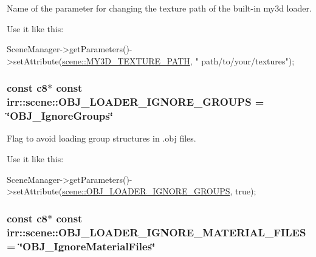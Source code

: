 Name of the parameter for changing the texture path of the built-\/in my3d loader. 

Use it like this\+: 
\begin{DoxyCode}
SceneManager->getParameters()->setAttribute(\hyperlink{namespaceirr_1_1scene_a54eb9ea68ba13b4689444f8d34e338b9}{scene::MY3D\_TEXTURE\_PATH}, \textcolor{stringliteral}{"
      path/to/your/textures"});
\end{DoxyCode}
\subsubsection[{\texorpdfstring{O\+B\+J\+\_\+\+L\+O\+A\+D\+E\+R\+\_\+\+I\+G\+N\+O\+R\+E\+\_\+\+G\+R\+O\+U\+PS}{OBJ\_LOADER\_IGNORE\_GROUPS}}]{\setlength{\rightskip}{0pt plus 5cm}const {\bf c8}$\ast$ const irr\+::scene\+::\+O\+B\+J\+\_\+\+L\+O\+A\+D\+E\+R\+\_\+\+I\+G\+N\+O\+R\+E\+\_\+\+G\+R\+O\+U\+PS = \char`\"{}O\+B\+J\+\_\+\+Ignore\+Groups\char`\"{}}\hypertarget{namespaceirr_1_1scene_afb0c389302c1e7ad39f83d558dbb2699}{}\label{namespaceirr_1_1scene_afb0c389302c1e7ad39f83d558dbb2699}


Flag to avoid loading group structures in .obj files. 

Use it like this\+: 
\begin{DoxyCode}
SceneManager->getParameters()->setAttribute(\hyperlink{namespaceirr_1_1scene_afb0c389302c1e7ad39f83d558dbb2699}{scene::OBJ\_LOADER\_IGNORE\_GROUPS},
       \textcolor{keyword}{true});
\end{DoxyCode}
\subsubsection[{\texorpdfstring{O\+B\+J\+\_\+\+L\+O\+A\+D\+E\+R\+\_\+\+I\+G\+N\+O\+R\+E\+\_\+\+M\+A\+T\+E\+R\+I\+A\+L\+\_\+\+F\+I\+L\+ES}{OBJ\_LOADER\_IGNORE\_MATERIAL\_FILES}}]{\setlength{\rightskip}{0pt plus 5cm}const {\bf c8}$\ast$ const irr\+::scene\+::\+O\+B\+J\+\_\+\+L\+O\+A\+D\+E\+R\+\_\+\+I\+G\+N\+O\+R\+E\+\_\+\+M\+A\+T\+E\+R\+I\+A\+L\+\_\+\+F\+I\+L\+ES = \char`\"{}O\+B\+J\+\_\+\+Ignore\+Material\+Files\char`\"{}}\hypertarget{namespaceirr_1_1scene_ac7d5a31e2146062ddbde288115bb6c7b}{}\label{namespaceirr_1_1scene_ac7d5a31e2146062ddbde288115bb6c7b}


